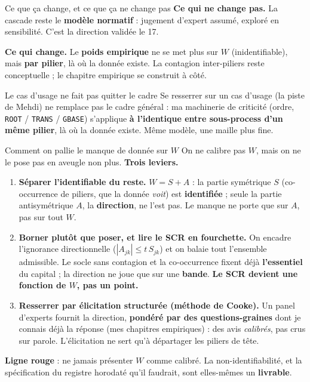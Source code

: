 \documentclass[11pt]{beamer}
\begin{document}
\begin{frame}{Ce que ça change, et ce que ça ne change pas}
\textbf{Ce qui ne change pas.} La cascade reste le \textbf{modèle normatif} : jugement
d'expert assumé, exploré en sensibilité. C'est la direction validée le 17.
\medskip

\textbf{Ce qui change.} Le \textbf{poids empirique} ne se met plus sur $W$ (inidentifiable),
mais \textbf{par pilier}, là où la donnée existe. La contagion inter-piliers reste
conceptuelle ; le chapitre empirique se construit à côté.
\vfill
\begin{block}{Le cas d'usage ne fait pas quitter le cadre}
Se resserrer sur un cas d'usage (la piste de Mehdi) ne remplace pas le cadre général :
ma machinerie de criticité (ordre, \texttt{ROOT} / \texttt{TRANS} / \texttt{GBASE})
s'applique \textbf{à l'identique entre sous-process d'un même pilier}, là où la donnée
existe. Même modèle, une maille plus fine.
\end{block}
\end{frame}

\begin{frame}{Comment on pallie le manque de donnée sur $W$}
\small
On ne calibre pas $W$, mais on ne le pose pas en aveugle non plus. \textbf{Trois leviers.}
\begin{enumerate}
\item \textbf{Séparer l'identifiable du reste.} $W = S + A$ : la partie symétrique $S$
      (co-occurrence de piliers, que la donnée \emph{voit}) est \textbf{identifiée} ;
      seule la partie antisymétrique $A$, la \textbf{direction}, ne l'est pas. Le manque
      ne porte que sur $A$, pas sur tout $W$.
\item \textbf{Borner plutôt que poser, et lire le SCR en fourchette.} On encadre
      l'ignorance directionnelle ($|A_{jk}| \le t\,S_{jk}$) et on balaie tout l'ensemble
      admissible. Le socle sans contagion et la co-occurrence fixent déjà
      \textbf{l'essentiel} du capital ; la direction ne joue que sur une \textbf{bande}.
      \textbf{Le SCR devient une fonction de $W$, pas un point.}
\item \textbf{Resserrer par élicitation structurée (méthode de Cooke).} Un panel
      d'experts fournit la direction, \textbf{pondéré par des questions-graines} dont je
      connais déjà la réponse (mes chapitres empiriques) : des avis \emph{calibrés}, pas
      crus sur parole. L'élicitation ne sert qu'à départager les piliers de tête.
\end{enumerate}
\textbf{Ligne rouge} : ne jamais présenter $W$ comme calibré. La non-identifiabilité, et
la spécification du registre horodaté qu'il faudrait, sont elles-mêmes un \textbf{livrable}.
\end{frame}
\end{document}
